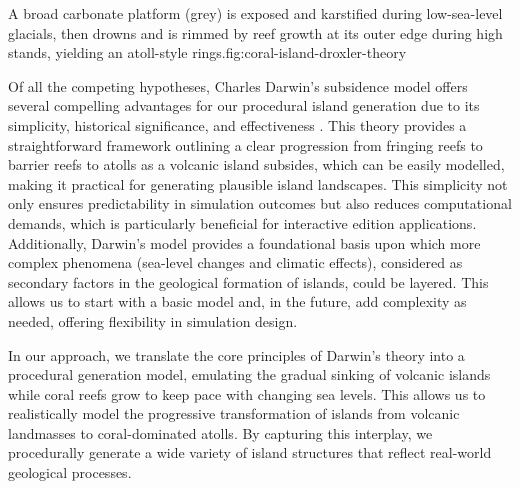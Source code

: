 \begin{Itemize}
    {A broad carbonate platform (grey) is exposed and karstified during low-sea-level glacials, then drowns and is rimmed by reef growth at its outer edge during high stands, yielding an atoll-style rings.}{fig:coral-island-droxler-theory}

\end{Itemize}

Of all the competing hypotheses, Charles Darwin's subsidence model offers several compelling advantages for our procedural island generation due to its simplicity, historical significance, and effectiveness \cite{Tomascik1997}. This theory provides a straightforward framework outlining a clear progression from fringing reefs to barrier reefs to atolls as a volcanic island subsides, which can be easily modelled, making it practical for generating plausible island landscapes. This simplicity not only ensures predictability in simulation outcomes but also reduces computational demands, which is particularly beneficial for interactive edition applications. Additionally, Darwin's model provides a foundational basis upon which more complex phenomena (sea-level changes and climatic effects), considered as secondary factors in the geological formation of islands, could be layered. This allows us to start with a basic model and, in the future, add complexity as needed, offering flexibility in simulation design.

In our approach, we translate the core principles of Darwin's theory into a procedural generation model, emulating the gradual sinking of volcanic islands while coral reefs grow to keep pace with changing sea levels. This allows us to realistically model the progressive transformation of islands from volcanic landmasses to coral-dominated atolls. By capturing this interplay, we procedurally generate a wide variety of island structures that reflect real-world geological processes.

